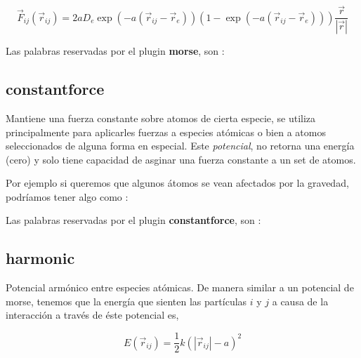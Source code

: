 $$\vec{F}_{ij} ( \vec{r}_{ij}) = 2aD_e\exp(-a(\vec{r}_{ij}-\vec{r}_e))\left(1-\exp(-a(\vec{r}_{ij}-\vec{r}_e))\right)\frac{\vec{r}}{|\vec{r}|}$$

Las palabras reservadas por el plugin \textbf{morse}, son :


\subsection{constantforce}
Mantiene una fuerza constante sobre atomos de cierta especie, se utiliza principalmente para aplicarles fuerzas a especies at\'omicas o bien a atomos seleccionados de alguna forma en especial. Este \textit{potencial}, no retorna una energ\'ia (cero) y solo tiene capacidad de asginar una fuerza constante a un set de atomos.

Por ejemplo si queremos que algunos \'atomos se vean afectados por la gravedad, podr\'iamos tener algo como :


Las palabras reservadas por el plugin \textbf{constantforce}, son :


\subsection{harmonic}
Potencial arm\'onico entre especies at\'omicas. De manera similar a un potencial de morse, tenemos que la energ\'ia que sienten las part\'iculas $i$ y $j$ a causa de la interacci\'on a trav\'es de \'este potencial es,

$$E(\vec{r}_{ij}) = \frac{1}{2}k\left(|\vec{r}_{ij}|-a\right)^2$$

